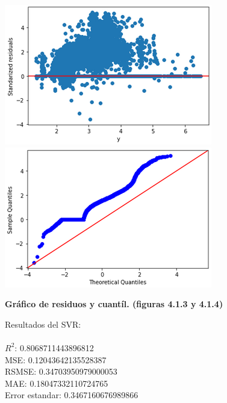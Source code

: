 \documentclass{article}
\begin{document}
            \includegraphics[scale=0.6]{images/residuos-stage-MLP1.PNG} 
            \includegraphics[scale=0.6]{images/residuos-stage-quantil2.PNG} \\
            \begin{center}
                \textbf{Gráfico de residuos y cuantíl. (figuras 4.1.3 y 4.1.4)}
            \end{center}
    
    
        Resultados del SVR:\\
        \\
        $R^2$:  0.8068711443896812\\
        MSE:  0.12043642135528387\\
        RSMSE:  0.34703950979000053\\
        MAE:  0.18047332110724765\\
        Error estandar:  0.3467160676989866\\
    
\end{document}
